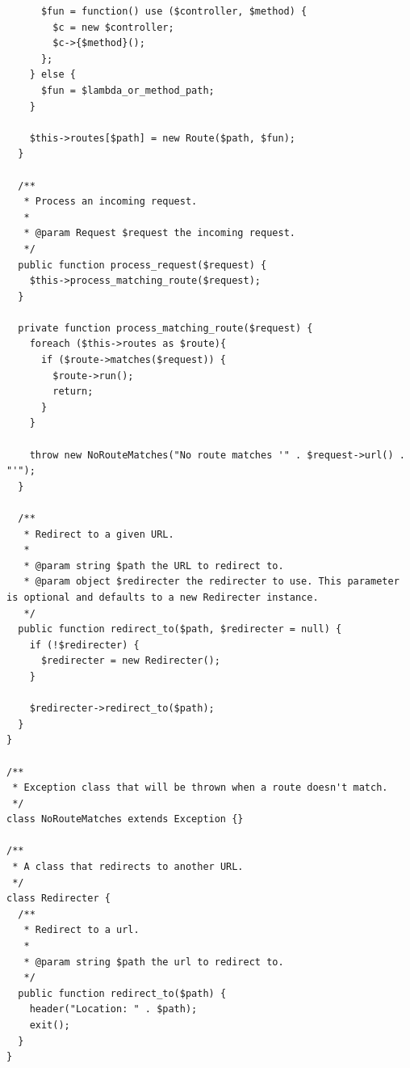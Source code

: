 \documentclass[12pt]{article}
\begin{document}
\begin{verbatim}
      $fun = function() use ($controller, $method) {
        $c = new $controller;
        $c->{$method}();
      };
    } else {
      $fun = $lambda_or_method_path;
    }

    $this->routes[$path] = new Route($path, $fun);
  }

  /**
   * Process an incoming request.
   *
   * @param Request $request the incoming request.
   */
  public function process_request($request) {
    $this->process_matching_route($request);
  }

  private function process_matching_route($request) {
    foreach ($this->routes as $route){
      if ($route->matches($request)) {
        $route->run();
        return;
      }
    }

    throw new NoRouteMatches("No route matches '" . $request->url() . "'");
  }

  /**
   * Redirect to a given URL.
   *
   * @param string $path the URL to redirect to.
   * @param object $redirecter the redirecter to use. This parameter is optional and defaults to a new Redirecter instance.
   */
  public function redirect_to($path, $redirecter = null) {
    if (!$redirecter) {
      $redirecter = new Redirecter();
    }

    $redirecter->redirect_to($path);
  }
}

/**
 * Exception class that will be thrown when a route doesn't match.
 */
class NoRouteMatches extends Exception {}

/**
 * A class that redirects to another URL.
 */
class Redirecter {
  /**
   * Redirect to a url.
   *
   * @param string $path the url to redirect to.
   */
  public function redirect_to($path) {
    header("Location: " . $path);
    exit();
  }
}
\end{verbatim}
\end{document}
